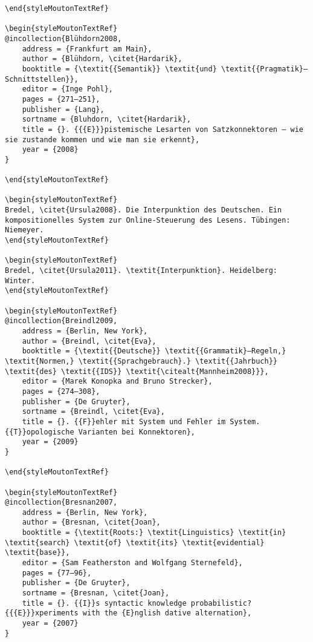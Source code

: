 \begin{styleMoutonHeadingRef}
\begin{verbatim}
\end{styleMoutonTextRef}

\begin{styleMoutonTextRef}
@incollection{Blühdorn2008,
	address = {Frankfurt am Main},
	author = {Blühdorn, \citet{Hardarik},
	booktitle = {\textit{{Semantik}} \textit{und} \textit{{Pragmatik}—Schnittstellen}},
	editor = {Inge Pohl},
	pages = {271–251},
	publisher = {Lang},
	sortname = {Bluhdorn, \citet{Hardarik},
	title = {}. {{{E}}}pistemische Lesarten von Satzkonnektoren – wie sie zustande kommen und wie man sie erkennt},
	year = {2008}
}

\end{styleMoutonTextRef}

\begin{styleMoutonTextRef}
Bredel, \citet{Ursula2008}. Die Interpunktion des Deutschen. Ein kompositionelles System zur Online-Steuerung des Lesens. Tübingen: Niemeyer.
\end{styleMoutonTextRef}

\begin{styleMoutonTextRef}
Bredel, \citet{Ursula2011}. \textit{Interpunktion}. Heidelberg: Winter.
\end{styleMoutonTextRef}

\begin{styleMoutonTextRef}
@incollection{Breindl2009,
	address = {Berlin, New York},
	author = {Breindl, \citet{Eva},
	booktitle = {\textit{{Deutsche}} \textit{{Grammatik}—Regeln,} \textit{Normen,} \textit{{Sprachgebrauch}.} \textit{{Jahrbuch}} \textit{des} \textit{{IDS}} \textit{\citealt{Mannheim2008}}},
	editor = {Marek Konopka and Bruno Strecker},
	pages = {274–308},
	publisher = {De Gruyter},
	sortname = {Breindl, \citet{Eva},
	title = {}. {{F}}ehler mit System und Fehler im System. {{T}}opologische Varianten bei Konnektoren},
	year = {2009}
}

\end{styleMoutonTextRef}

\begin{styleMoutonTextRef}
@incollection{Bresnan2007,
	address = {Berlin, New York},
	author = {Bresnan, \citet{Joan},
	booktitle = {\textit{Roots:} \textit{Linguistics} \textit{in} \textit{search} \textit{of} \textit{its} \textit{evidential} \textit{base}},
	editor = {Sam Featherston and Wolfgang Sternefeld},
	pages = {77–96},
	publisher = {De Gruyter},
	sortname = {Bresnan, \citet{Joan},
	title = {}. {{I}}s syntactic knowledge probabilistic? {{{E}}}xperiments with the {E}nglish dative alternation},
	year = {2007}
}


\end{verbatim}
\end{styleMoutonHeadingRef}

